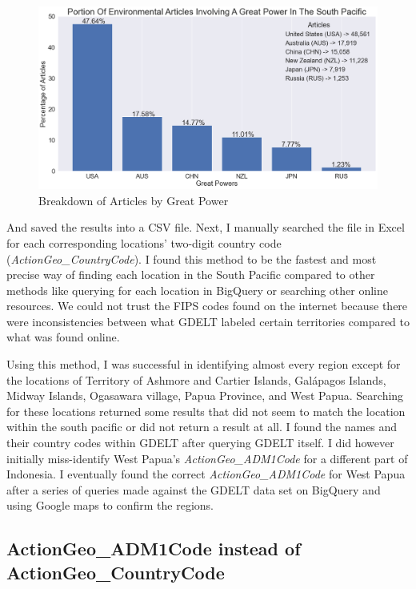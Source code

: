 \documentclass[12pt]{article}
\begin{document}
\begin{figure}
	\centering
	\includegraphics[width=\textwidth]{GD Portions}
	\caption{Breakdown of Articles by Great Power}
    \label{fig:mesh2}
\end{figure}

And saved the results into a CSV file. Next, I manually searched the file in Excel for each corresponding locations’ two-digit country code (\textit{ActionGeo\_CountryCode}). I found this method to be the fastest and most precise way of finding each location in the South Pacific compared to other methods like querying for each location in BigQuery or searching other online resources. We could not trust the FIPS codes found on the internet because there were inconsistencies between what GDELT labeled certain territories compared to what was found online.

Using this method, I was successful in identifying almost every region except for the locations of Territory of Ashmore and Cartier Islands, Galápagos Islands, Midway Islands, Ogasawara village, Papua Province, and West Papua. Searching for these locations returned some results that did not seem to match the location within the south pacific or did not return a result at all. I found the names and their country codes within GDELT after querying GDELT itself. I did however initially miss-identify West Papua's \textit{ActionGeo\_ADM1Code} for a different part of Indonesia. I eventually found the correct \textit{ActionGeo\_ADM1Code} for West Papua after a series of queries made against the GDELT data set on BigQuery and using Google maps to confirm the regions. 

\subsection*{ActionGeo\_ADM1Code instead of ActionGeo\_CountryCode}
\end{document}
